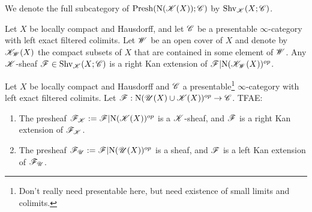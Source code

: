 \documentclass[../../thesis.tex]{subfiles}
\begin{document}
\begin{definition}
    We denote the full subcategory of $\mathrm{Presh}(\mathrm{N}(\mathscr{K}(X)); \mathscr{C})$ by $\mathrm{Shv}_{\mathscr{K}}(X;\mathscr{C})$.
\end{definition}
\begin{lemma}\label{7.3.4.8}
    Let $X$ be locally compact and Hausdorff, and let $\mathscr{C}$ be a presentable $\infty$-category with left exact filtered colimits.
    Let $\mathscr{W}$ be an open cover of $X$ and denote by $\mathscr{K}_{\mathscr{W}}(X)$ the compact subsets of $X$ that are contained in some element of $\mathscr{W}$.
    Any $\mathscr{K}$-sheaf $\mathscr{F}\in \mathrm{Shv}_{\mathscr{K}}(X;\mathscr{C})$ is a right Kan extension of $\mathscr{F}|\mathrm{N}(\mathscr{K}_{\mathscr{W}}(X))^{op}$.
\end{lemma}
\begin{theorem}\label{7.3.4.9}
    Let $X$ be locally compact and Hausdorff and $\mathscr{C}$ a presentable\footnote{Don't really need presentable here, but need existence of small limits and colimits.} $\infty$-category with left exact filtered colimits.
    Let $\mathscr{F} : \mathrm{N}(\mathscr{U}(X) \cup \mathscr{K}(X))^{op} \to \mathscr{C}$. TFAE:
    \begin{enumerate}[]
        \item The presheaf $\mathscr{F}_{\mathscr{K}}:= \mathscr{F}|\mathrm{N}(\mathscr{K}(X))^{op}$ is a $\mathscr{K}$-sheaf, and $\mathscr{F}$ is a right Kan extension of $\mathscr{F}_{\mathscr{K}}$.
        \item The presheaf $\mathscr{F}_{\mathscr{U}}:=\mathscr{F}|\mathrm{N}(\mathscr{U}(X))^{op}$ is a sheaf, and $\mathscr{F}$ is a left Kan extension of $\mathscr{F}_{\mathscr{U}}$.
    \end{enumerate}
\end{theorem}
\end{document}
